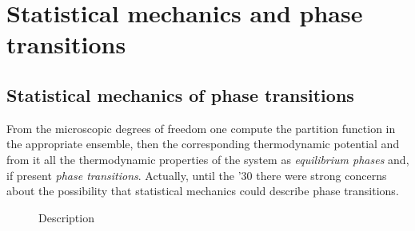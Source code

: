 \documentclass[../main/main.tex]{subfiles}
\begin{document}
\chapter{Statistical mechanics and phase transitions}


\section{Statistical mechanics of phase transitions}

From the microscopic degrees of freedom one compute the partition function in the appropriate ensemble, then the corresponding thermodynamic potential and from it all the thermodynamic properties of the system as \emph{equilibrium phases} and, if present \emph{phase transitions}. Actually, until the '30 there were strong concerns about the possibility that statistical mechanics could describe phase transitions.

\begin{figure}[h!]
\begin{minipage}[c]{0.5\linewidth}
\centering
{}
\end{minipage}
\begin{minipage}[]{0.5\linewidth}
\centering
{}
\end{minipage}
\caption{\label{fig:} Description}
\end{figure}
\end{document}
